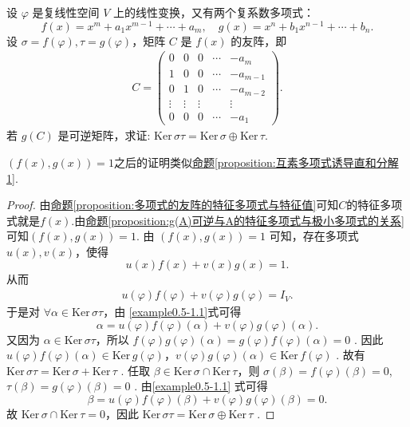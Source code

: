 \documentclass[../../main.tex]{subfiles}
\begin{document}
\begin{example}
设 $\varphi$ 是复线性空间 $V$ 上的线性变换，又有两个复系数多项式：
\[f(x)=x^m + a_1x^{m - 1}+\cdots + a_m, \quad g(x)=x^n + b_1x^{n - 1}+\cdots + b_n.\]
设 $\sigma = f(\varphi),\tau = g(\varphi)$，矩阵 $C$ 是 $f(x)$ 的友阵，即
\begin{align*}
C = \begin{pmatrix}
0 & 0 & 0 & \cdots & -a_m \\
1 & 0 & 0 & \cdots & -a_{m - 1} \\
0 & 1 & 0 & \cdots & -a_{m - 2} \\
\vdots & \vdots & \vdots & & \vdots \\
0 & 0 & 0 & \cdots & -a_1
\end{pmatrix}.
\end{align*}
若 $g(C)$ 是可逆矩阵，求证: $\mathrm{Ker}\,\sigma \tau =\mathrm{Ker}\,\sigma \oplus \mathrm{Ker}\,\tau $. 
\end{example}
\begin{note}
$(f(x),g(x))=1$之后的证明类似\hyperref[proposition:互素多项式诱导直和分解1]{命题\ref{proposition:互素多项式诱导直和分解1}}.
\end{note}
\begin{proof}
由\hyperref[proposition:多项式的友阵的特征多项式与特征值]{命题\ref{proposition:多项式的友阵的特征多项式与特征值}}可知$C$的特征多项式就是$f(x)$.由\hyperref[proposition:g(A)可逆与A的特征多项式与极小多项式的关系]{命题\ref{proposition:g(A)可逆与A的特征多项式与极小多项式的关系}}可知$(f(x),g(x))=1$.
由 $(f(x),g(x)) = 1$ 可知，存在多项式 $u(x),v(x)$，使得
\[u(x)f(x)+v(x)g(x)=1.\]
从而
\begin{align}
u(\varphi)f(\varphi)+v(\varphi)g(\varphi)=I_V. \label{example0.5-1.1}
\end{align}
于是对 $\forall \alpha\in\mathrm{Ker}\,\sigma\tau$，由 
\eqref{example0.5-1.1}式可得
\[\alpha = u(\varphi)f(\varphi)(\alpha)+v(\varphi)g(\varphi)(\alpha).\]
又因为 $\alpha\in\mathrm{Ker}\,\sigma\tau$，所以 $f(\varphi)g(\varphi)(\alpha)=g(\varphi)f(\varphi)(\alpha)=0$ . 因此 $u(\varphi)f(\varphi)(\alpha)\in\mathrm{Ker}\,g(\varphi)$，$v(\varphi)g(\varphi)(\alpha)\in\mathrm{Ker}\,f(\varphi)$ .
故有 $\mathrm{Ker}\,\sigma\tau=\mathrm{Ker}\,\sigma+\mathrm{Ker}\,\tau$ . 任取 $\beta\in\mathrm{Ker}\,\sigma\cap\mathrm{Ker}\,\tau$，则 $\sigma(\beta)=f(\varphi)(\beta)=0$,$\tau(\beta)=g(\varphi)(\beta)=0$ . 由\eqref{example0.5-1.1} 式可得
\[\beta = u(\varphi)f(\varphi)(\beta)+v(\varphi)g(\varphi)(\beta)=0.\]
故 $\mathrm{Ker}\,\sigma\cap\mathrm{Ker}\,\tau = 0$，因此 $\mathrm{Ker}\,\sigma\tau=\mathrm{Ker}\,\sigma\oplus\mathrm{Ker}\,\tau$ . 
\end{proof}
\end{document}
